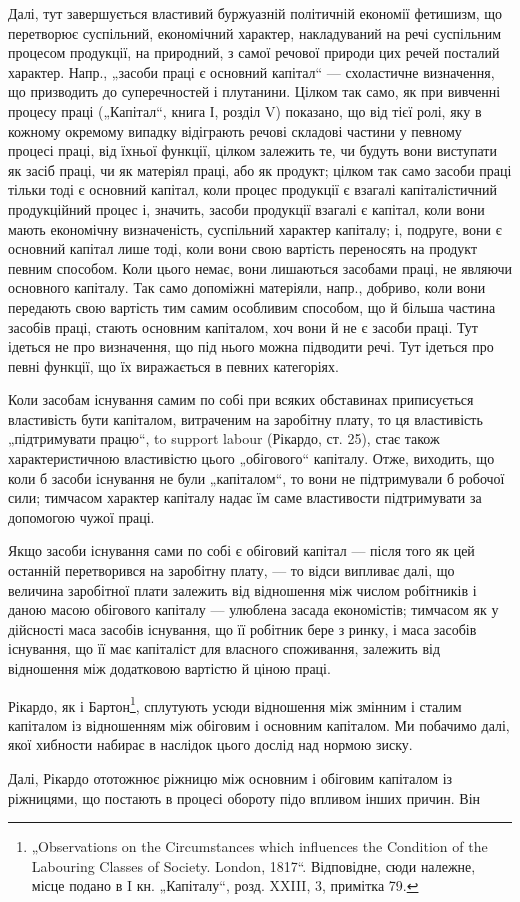 Далі, тут завершується властивий буржуазній політичній економії фетишизм,
що перетворює суспільний, економічний характер, накладуваний
на речі суспільним процесом продукції, на природний, з самої речової
природи цих речей посталий характер. Напр., „засоби праці є основний
капітал“ — схоластичне визначення, що призводить до суперечностей і плутанини.
Цілком так само, як при вивченні процесу праці („Капітал“, книга
І, розділ V) показано, що від тієї ролі, яку в кожному окремому
випадку відіграють речові складові частини у певному процесі праці,
від їхньої функції, цілком залежить те, чи будуть вони виступати як
засіб праці, чи як матеріял праці, або як продукт; цілком так само засоби
праці тільки тоді є основний капітал, коли процес продукції є взагалі
капіталістичний продукційний процес і, значить, засоби продукції
взагалі є капітал, коли вони мають економічну визначеність, суспільний
характер капіталу; і, подруге, вони є основний капітал лише тоді, коли
вони свою вартість переносять на продукт певним способом. Коли цього
немає, вони лишаються засобами праці, не являючи основного капіталу.
Так само допоміжні матеріяли, напр., добриво, коли вони передають
свою вартість тим самим особливим способом, що й більша частина засобів
праці, стають основним капіталом, хоч вони й не є засоби праці.
Тут ідеться не про визначення, що під нього можна підводити речі. Тут
ідеться про певні функції, що їх виражається в певних категоріях.

Коли засобам існування самим по собі при всяких обставинах приписується
властивість бути капіталом, витраченим на заробітну плату, то
ця властивість „підтримувати працю“, to support labour (Рікардо, ст. 25),
стає також характеристичною властивістю цього „обігового“ капіталу.
Отже, виходить, що коли б засоби існування не були „капіталом“, то
вони не підтримували б робочої сили; тимчасом характер капіталу надає
їм саме властивости підтримувати  за допомогою чужої праці.

Якщо засоби існування сами по собі є обіговий капітал — після того
як цей останній перетворився на заробітну плату, — то відси випливає
далі, що величина заробітної плати залежить від відношення між числом
робітників і даною масою обігового капіталу — улюблена засада економістів;
тимчасом як у дійсності маса засобів існування, що її робітник
бере з ринку, і маса засобів існування, що її має капіталіст для власного
споживання, залежить від відношення між додатковою вартістю й ціною
праці.

Рікардо, як і Бартон\footnote{
„Observations on the Circumstances which influences the Condition of the
Labouring Classes of Society. London, 1817“. Відповідне, сюди належне, місце
подано в I кн. „Капіталу“, розд. XXIII, 3, примітка 79.
}, сплутують усюди відношення між змінним і сталим
капіталом із відношенням між обіговим і основним капіталом. Ми побачимо
далі, якої хибности набирає в наслідок цього дослід над нормою зиску.

Далі, Рікардо ототожнює ріжницю між основним і обіговим капіталом із
ріжницями, що постають в процесі обороту підо впливом інших причин. Він
\parbreak{}  %
